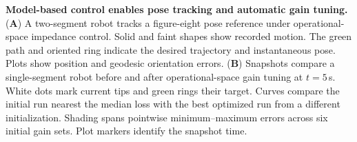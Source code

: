 \caption{\textbf{Model-based control enables pose tracking and automatic gain tuning.}
(\textbf{A}) A two-segment robot tracks a figure-eight pose reference under operational-space impedance control. Solid and faint shapes show recorded motion. The green path and oriented ring indicate the desired trajectory and instantaneous pose. Plots show position and geodesic orientation errors.
(\textbf{B}) Snapshots compare a single-segment robot before and after operational-space gain tuning at $t=5$\,s. White dots mark current tips and green rings their target. Curves compare the initial run nearest the median loss with the best optimized run from a different initialization. Shading spans pointwise minimum--maximum errors across six initial gain sets. Plot markers identify the snapshot time.}
